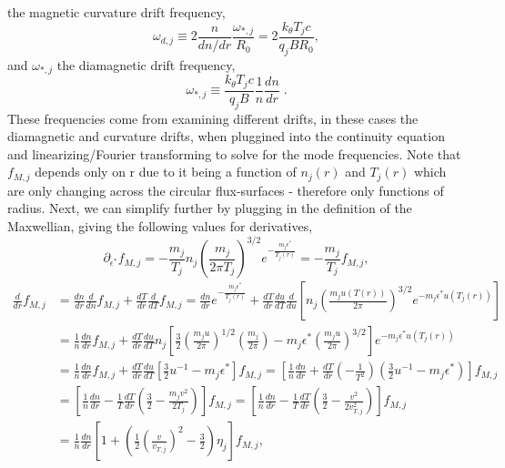 \documentclass[12pt]{article}
\numberwithin{equation}{subsection}
\begin{document}
the magnetic curvature drift frequency,
   \begin{equation}
      \omega_{d,j} \equiv 2\frac{n}{dn/dr}\frac{\omega_{*,j}}{R_0} = 2\frac{k_\theta T_j c}{q_j B R_0},
   \end{equation}
and $\omega_{*,j}$ the diamagnetic drift frequency,
   \begin{equation}
      \omega_{*,j} \equiv \frac{k_\theta T_j c}{q_j B}\frac{1}{n}\frac{dn}{dr}\;.
   \end{equation}
These frequencies come from examining different drifts, in these cases the diamagnetic and curvature drifts, when pluggined into the
continuity equation and linearizing/Fourier transforming to solve for the mode frequencies\cite{WessonE}.
Note that $f_{M,j}$ depends only on r due to it being a function of $n_j(r)$ and $T_j(r)$ which are only changing across the circular
flux-surfaces - therefore only functions of radius. Next, we can simplify further by plugging in the definition of the Maxwellian,
giving the following values for derivatives,
   \begin{equation}
      \partial_{\epsilon^*}f_{M,j} = -\frac{m_j}{T_j}n_j\left(\frac{m_j}{2\pi T_j}\right)^{3/2}e^{-\frac{m_j \epsilon^*}{T_j(r)}} =
                                 -\frac{m_j}{T_j}f_{M,j},
   \end{equation}
   \begin{equation}
   \begin{aligned}
      \frac{d}{dr}f_{M,j} &= \frac{dn}{dr}\frac{d}{dn}f_{M,j} + \frac{dT}{dr}\frac{d}{dT}f_{M,j} = 
                         \frac{dn}{dr}e^{-\frac{m_j \epsilon^*}{T_j(r)}} + 
                         \frac{dT}{dr}\frac{du}{dT}\frac{d}{du}[n_j\left(\frac{m_j u(T(r))}{2\pi}\right)^{3/2}e^{-m_j \epsilon^* u(T_j(r))}] \\
                      &= \frac{1}{n}\frac{dn}{dr}f_{M,j} + \frac{dT}{dr}\frac{du}{dT}n_j[\frac{3}{2}\left(\frac{m_ju}{2\pi}\right)^{1/2}
                         \left(\frac{m_j}{2\pi}\right) - m_j\epsilon^*\left(\frac{m_ju}{2\pi}\right)^{3/2}]e^{-m_j \epsilon^* u(T_j(r))} \\
                      &= \frac{1}{n}\frac{dn}{dr}f_{M,j} + \frac{dT}{dr}\frac{du}{dT}[\frac{3}{2}u^{-1} - m_j\epsilon^*]f_{M,j}
                       = [\frac{1}{n}\frac{dn}{dr} + \frac{dT}{dr}(-\frac{1}{T^2})(\frac{3}{2}u^{-1} - m_j\epsilon^*)]f_{M,j} \\
                      &= [\frac{1}{n}\frac{dn}{dr} - \frac{1}{T}\frac{dT}{dr}(\frac{3}{2} - \frac{m_jv^2}{2T_j})]f_{M,j}
                       = [\frac{1}{n}\frac{dn}{dr} - \frac{1}{T}\frac{dT}{dr}(\frac{3}{2} - \frac{v^2}{2v_{T,j}^2})]f_{M,j} \\
                      &= \frac{1}{n}\frac{dn}{dr}[1 + (\frac{1}{2}\left(\frac{v}{v_{T,j}}\right)^2 - \frac{3}{2})\eta_j]f_{M,j},
   \end{aligned}
   \end{equation}
\end{document}
